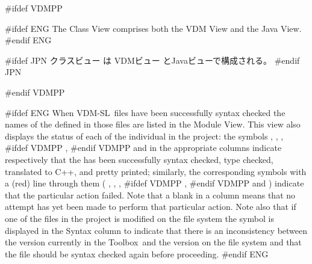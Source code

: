 \documentclass[\pformat,12pt]{article}
\newcommand{\vdmslpp}{VDM-SL}
\newcommand{\Toolbox}{Toolbox}
\newcommand{\vdmModView}{\guicmd{Module View}}
\newcommand{\vdmModView}{\guicmd{モジュールビュー}}
\newcommand{\vdmslpp}{VDM++}
\newcommand{\Toolbox}{Toolbox}
\newcommand{\vdmModView}{\guicmd{VDM View}}
\newcommand{\vdmModView}{\guicmd{VDMビュー}}
\newcommand{\guicmd}[1]{{\sf #1}}
\newcommand{\guicmd}[1]{{\gt #1}}
\begin{document}
#ifdef VDMPP

#ifdef ENG
The \guicmd{Class View} comprises both the \guicmd{VDM View} and the
\guicmd{Java View}.
#endif ENG

#ifdef JPN
\guicmd{クラスビュー} は \guicmd{VDMビュー} と\guicmd{Javaビュー}で構成される。
#endif JPN

#endif VDMPP

#ifdef ENG
When \vdmslpp\ files have been successfully syntax checked the names
of the  defined in those
files are listed in the \vdmModView. This view also displays the
status of each of the individual 
 in the project: the
symbols 
,
,
,
#ifdef VDMPP
,
#endif VDMPP
and
in the appropriate columns indicate respectively that the
 has been successfully
syntax checked, type checked, translated to C++,
 and pretty
printed;
similarly, the corresponding symbols with a (red) line through them (%
,
,
,
#ifdef VDMPP
,
#endif VDMPP
and
)
indicate that the particular action failed. Note that a blank in a
column means that no attempt has yet been made to perform that
particular action. Note also that if one of the files in the project
is modified on the file system the symbol
is displayed in the \guicmd{Syntax} column  to indicate
that there is an inconsistency between the version currently in the \Toolbox\ and the
version on the file system and that the file should be syntax checked
again before proceeding.
#endif ENG
\end{document}
